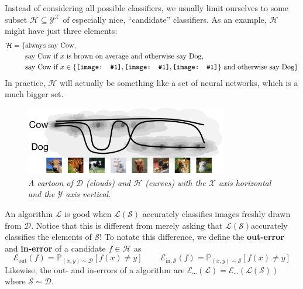 \documentclass{article}
\newcommand{\PP}{\mathbb{P}}
\newcommand{\Dd}{\mathcal{D}}
\newcommand{\Ee}{\mathcal{E}}
\newcommand{\Hh}{\mathcal{H}}
\newcommand{\Ll}{\mathcal{L}}
\newcommand{\Ss}{\mathcal{S}}
\newcommand{\Xx}{\mathcal{X}}
\newcommand{\Yy}{\mathcal{Y}}
\newcommand{\sdia}[1]{
\begingroup
\setbox0=\hbox{\texttt{[image: \#1]}}%
\parbox{\wd0}{\box0}\endgroup
}
\begin{document}
            Instead of considering all possible classifiers, we usually limit
            ourselves to some subset $\Hh \subseteq \Yy^{\Xx}$ of especially
            nice, ``candidate'' classifiers.
            As an example, $\Hh$ might have just three elements:
            \begin{align*}
                \Hh = \{
                    &\text{always say Cow}, \\
                    &\text{say Cow if $x$ is brown on average
                        and otherwise say Dog}, \\
                    &\text{say Cow if
                        $x \in \{\sdia{cow-b}, \sdia{cow-c}, \sdia{cow-e}\}$
                        and otherwise say Dog}
                \}
            \end{align*}
            In practice, $\Hh$ will actually be something like a set of neural
            networks, which is a much bigger set.
            \begin{figure}[h!]
                \centering
                \includegraphics[height=3cm]{hd}
                \caption{\emph{
                    A cartoon of $\Dd$ (clouds) and $\Hh$ (curves) with
                    the $\Xx$ axis horizontal and the $\Yy$ axis vertical. 
                }}
            \end{figure}

            An algorithm $\Ll$ is good when $\Ll(\Ss)$ accurately classifies
            images freshly drawn from $\Dd$.  Notice that this is different
            from merely asking that $\Ll(\Ss) $accurately classifies the
            elements of $\Ss$!  To notate this difference, we define the
            \textbf{out-error} and \textbf{in-error} of a candidate $f \in \Hh$
            as
            $$
                \Ee_{\text{out}}(f) = \PP_{(x,y)\sim\Dd}   
                                        \left[
                                            f(x) \neq y
                                        \right]
                ~~~~~~~~~~
                \Ee_{\text{in},\Ss}(f) = \PP_{(x,y)\sim\Ss}   
                                       \left[
                                           f(x) \neq y
                                       \right]
            $$
            Likewise, the out- and in-errors of a algorithm are
            $
                \Ee_{\cdots}(\Ll) = \Ee_{\cdots}(\Ll(\Ss)) 
            $ where $\Ss\sim\Dd$.
\end{document}
